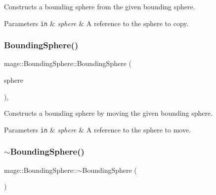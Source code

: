Constructs a bounding sphere from the given bounding sphere.


\begin{DoxyParams}[1]{Parameters}
\mbox{\tt in}  & {\em sphere} & A reference to the sphere to copy. \\
\hline
\end{DoxyParams}
\hypertarget{classmage_1_1_bounding_sphere_a566985b59dd05cc4545c41183338a275}{}\label{classmage_1_1_bounding_sphere_a566985b59dd05cc4545c41183338a275} 
\subsubsection{\texorpdfstring{Bounding\+Sphere()}{BoundingSphere()}\hspace{0.1cm}{\footnotesize\ttfamily [8/8]}}
{\footnotesize\ttfamily mage\+::\+Bounding\+Sphere\+::\+Bounding\+Sphere (\begin{DoxyParamCaption}\item[{\hyperlink{classmage_1_1_bounding_sphere}{Bounding\+Sphere} \&\&}]{sphere }\end{DoxyParamCaption})\hspace{0.3cm}{\ttfamily [default]}, {\ttfamily [noexcept]}}

Constructs a bounding sphere by moving the given bounding sphere.


\begin{DoxyParams}[1]{Parameters}
\mbox{\tt in}  & {\em sphere} & A reference to the sphere to move. \\
\hline
\end{DoxyParams}
\hypertarget{classmage_1_1_bounding_sphere_af8c185ef441e95fd1f833e22fdee2bb3}{}\label{classmage_1_1_bounding_sphere_af8c185ef441e95fd1f833e22fdee2bb3} 
\subsubsection{\texorpdfstring{$\sim$\+Bounding\+Sphere()}{~BoundingSphere()}}
{\footnotesize\ttfamily mage\+::\+Bounding\+Sphere\+::$\sim$\+Bounding\+Sphere (\begin{DoxyParamCaption}{ }\end{DoxyParamCaption})\hspace{0.3cm}{\ttfamily [default]}}

